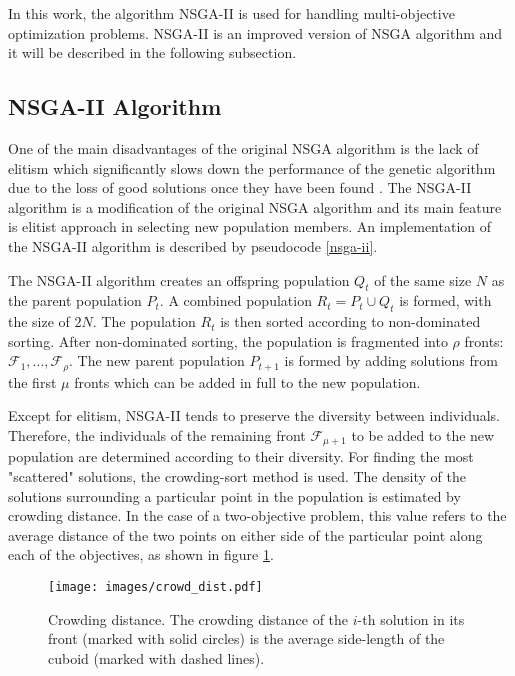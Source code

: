 In this work, the algorithm NSGA-II is used for handling multi-objective optimization problems. 
NSGA-II is an improved version of NSGA algorithm and it will be described in the following subsection. 

\subsection{NSGA-II Algorithm}
One of the main disadvantages of the original NSGA algorithm is the lack of elitism which significantly slows down the performance of the genetic algorithm due to the loss of good solutions once they have been found \cite{deb2000fast}. 
The NSGA-II algorithm is a modification of the original NSGA algorithm and its main feature is elitist approach in selecting new population members. 
An implementation of the NSGA-II algorithm is described by pseudocode \ref{nsga-ii}.

The NSGA-II algorithm creates an offspring population $Q_t$ of the same size $N$ as the parent population $P_t$.
A combined population $R_t = P_t \cup Q_t$ is formed, with the size of $2N$. 
The population $R_t$ is then sorted according to non-dominated sorting. 
After non-dominated sorting, the population is fragmented into $\rho$ fronts: $\mathcal{F}_1, ..., \mathcal{F}_\rho$.
The new parent population $P_{t+1}$ is formed by adding solutions from the first $\mu$ fronts which can be added in full to the new population. 

Except for elitism, NSGA-II tends to preserve the diversity between individuals. 
Therefore, the individuals of the remaining front $\mathcal{F}_{\mu+1}$ to be added to the new population are determined according to their diversity. 
For finding the most "scattered" solutions, the crowding-sort method is used. 
The density of the solutions surrounding a particular point in the population is estimated by crowding distance. 
In the case of a two-objective problem, this value refers to the average distance of the two points on either side of the particular point along each of the objectives, as shown in figure 
\ref{crowding_dist}. 

\begin{figure}[ht]
    \centering
    \texttt{[image: images/crowd\_dist.pdf]}
    \caption{Crowding distance. The crowding distance of the $i$-th solution in its front (marked with solid circles) is the average side-length of the cuboid (marked with dashed lines). }
    \label{crowding_dist}
\end{figure}

